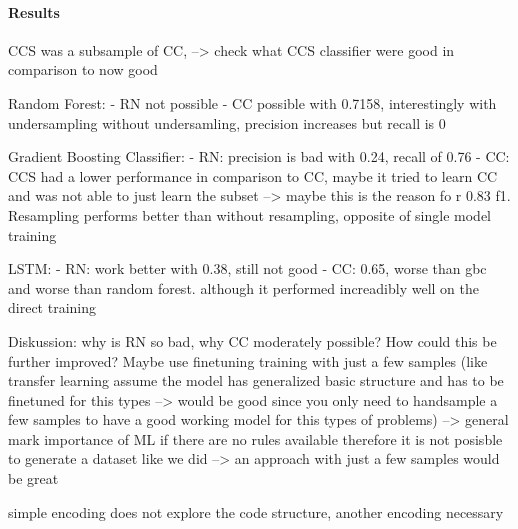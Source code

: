 \paragraph{Results}

CCS was a subsample of CC, --> check what CCS classifier were good in comparison to now good

Random Forest: 
- RN not possible
- CC possible with 0.7158, interestingly with undersampling 
without undersamling, precision increases but recall is 0

Gradient Boosting Classifier:
- RN: precision is bad with 0.24, recall of 0.76
- CC: CCS had a lower performance in comparison to CC, maybe it tried to learn CC and was not able to just learn the subset --> maybe this is the reason fo r 0.83 f1. Resampling performs better than without resampling, opposite of single model training

LSTM:
- RN: work better with 0.38, still not good
- CC: 0.65, worse than gbc and worse than random forest. although it performed increadibly well on the direct training

Diskussion:
why is RN so bad, why CC moderately possible?
How could this be further improved? Maybe use finetuning training with just a few samples (like transfer learning assume the model has generalized basic structure and has to be finetuned for this types --> would be good since you only need to handsample a few samples to have a good working model for this types of problems) --> general mark importance of ML if there are no rules available therefore it is not posisble to generate a dataset like we did --> an approach with just a few samples would be great

simple encoding does not explore the code structure, another encoding necessary